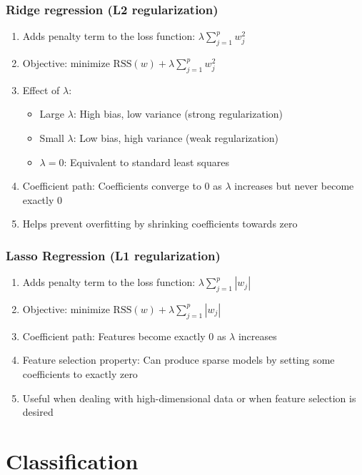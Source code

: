 \documentclass{article}
\begin{document}
\subsubsection{Ridge regression (L2 regularization)}
\begin{enumerate}
    \item Adds penalty term to the loss function: $\lambda \sum_{j=1}^p w_j^2$
    \item Objective: minimize $\text{RSS}(w) + \lambda \sum_{j=1}^p w_j^2$
    \item Effect of $\lambda$:
    \begin{itemize}
        \item Large $\lambda$: High bias, low variance (strong regularization)
        \item Small $\lambda$: Low bias, high variance (weak regularization)
        \item $\lambda = 0$: Equivalent to standard least squares
    \end{itemize}
    \item Coefficient path: Coefficients converge to 0 as $\lambda$ increases but never become exactly 0
    \item Helps prevent overfitting by shrinking coefficients towards zero
\end{enumerate}

\subsubsection{Lasso Regression (L1 regularization)}
\begin{enumerate}
    \item Adds penalty term to the loss function: $\lambda \sum_{j=1}^p |w_j|$
    \item Objective: minimize $\text{RSS}(w) + \lambda \sum_{j=1}^p |w_j|$
    \item Coefficient path: Features become exactly 0 as $\lambda$ increases
    \item Feature selection property: Can produce sparse models by setting some coefficients to exactly zero
    \item Useful when dealing with high-dimensional data or when feature selection is desired
\end{enumerate}

\section{Classification}
\end{document}
